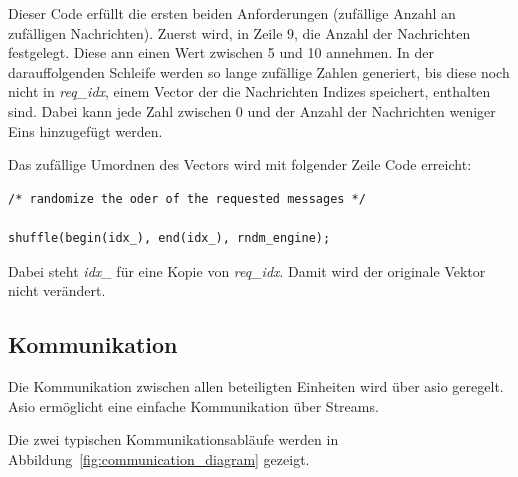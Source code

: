 \documentclass[]{article}
\begin{document}
Dieser Code erfüllt die ersten beiden Anforderungen (zufällige Anzahl an zufälligen Nachrichten). Zuerst wird, in Zeile 9, die Anzahl der Nachrichten festgelegt. Diese ann einen Wert zwischen 5 und 10 annehmen. In der darauffolgenden Schleife werden so lange zufällige Zahlen generiert, bis diese noch nicht in \textit{req\_idx}, einem Vector der die Nachrichten Indizes speichert, enthalten sind. Dabei kann jede Zahl zwischen 0 und der Anzahl der Nachrichten weniger Eins hinzugefügt werden.

Das zufällige Umordnen des Vectors wird mit folgender Zeile Code erreicht:

\begin{lstlisting}
/* randomize the oder of the requested messages */

shuffle(begin(idx_), end(idx_), rndm_engine);
\end{lstlisting}

Dabei steht \textit{idx\_} für eine Kopie von \textit{req\_idx}. Damit wird der originale Vektor nicht verändert.

\subsection{Kommunikation}
Die Kommunikation zwischen allen beteiligten Einheiten wird über asio geregelt. Asio ermöglicht eine einfache Kommunikation über Streams.

Die zwei typischen Kommunikationsabläufe werden in Abbildung~\ref{fig:communication_diagram} gezeigt.
\end{document}
